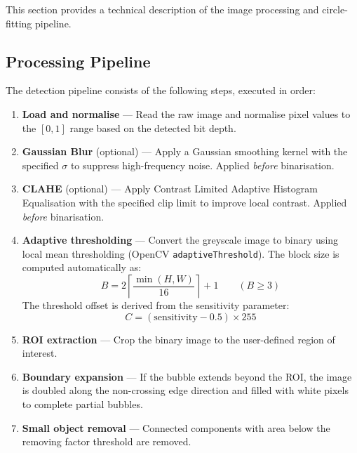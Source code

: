 \documentclass[11pt, letterpaper]{article}
\begin{document}
This section provides a technical description of the image processing and
circle-fitting pipeline.

\subsection{Processing Pipeline}

The detection pipeline consists of the following steps, executed in order:

\begin{enumerate}
    \item \textbf{Load and normalise} --- Read the raw image and normalise
          pixel values to the $[0, 1]$ range based on the detected bit depth.

    \item \textbf{Gaussian Blur} (optional) --- Apply a Gaussian smoothing
          kernel with the specified $\sigma$ to suppress high-frequency noise.
          Applied \emph{before} binarisation.

    \item \textbf{CLAHE} (optional) --- Apply Contrast Limited Adaptive
          Histogram Equalisation with the specified clip limit to improve
          local contrast. Applied \emph{before} binarisation.

    \item \textbf{Adaptive thresholding} --- Convert the greyscale image to
          binary using local mean thresholding (OpenCV
          \texttt{adaptiveThreshold}). The block size is computed
          automatically as:
          \[
              B = 2 \left\lceil \frac{\min(H, W)}{16} \right\rceil + 1
              \qquad (B \geq 3)
          \]
          The threshold offset is derived from the sensitivity parameter:
          \[
              C = (\text{sensitivity} - 0.5) \times 255
          \]

    \item \textbf{ROI extraction} --- Crop the binary image to the
          user-defined region of interest.

    \item \textbf{Boundary expansion} --- If the bubble extends beyond the
          ROI, the image is doubled along the non-crossing edge direction
          and filled with white pixels to complete partial bubbles.

    \item \textbf{Small object removal} --- Connected components with area
          below the removing factor threshold are removed.


\end{enumerate}
\end{document}
